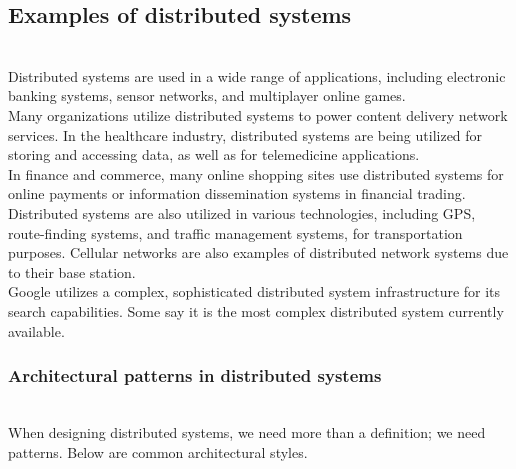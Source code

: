 \subsection{Examples of distributed systems}\label{aqbTe03o9ZD9uq5pU5Yo8}
\\
Distributed systems are used in a wide range of applications, including electronic banking systems, sensor networks, and multiplayer online games.
\\
Many organizations utilize distributed systems to power content delivery network services. In the healthcare industry, distributed systems are being utilized for storing and accessing data, as well as for telemedicine applications.
\\
In finance and commerce, many online shopping sites use distributed systems for online payments or information dissemination systems in financial trading.
\\
Distributed systems are also utilized in various technologies, including GPS, route-finding systems, and traffic management systems, for transportation purposes. Cellular networks are also examples of distributed network systems due to their base station.
\\
Google utilizes a complex, sophisticated distributed system infrastructure for its search capabilities. Some say it is the most complex distributed system currently available.

\subsubsection{Architectural patterns in distributed systems}\label{LyxBf2JyU4y0lOdlGb3Eb}
\\
When designing distributed systems, we need more than a definition; we need patterns. Below are common architectural styles.

